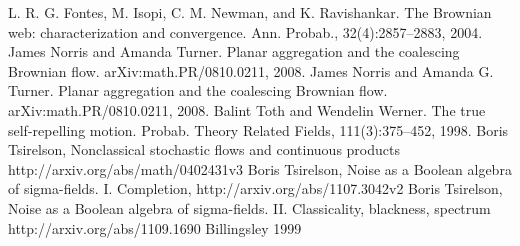 \begin{thebibliography}{99}
 L. R. G. Fontes, M. Isopi, C. M. Newman, and
  K. Ravishankar. The Brownian web: characterization and
  convergence. Ann. Probab., 32(4):2857--2883, 2004.
 James Norris and Amanda
  Turner. Planar aggregation and the coalescing Brownian flow.
  arXiv:math.PR/0810.0211, 2008.
 James Norris and Amanda
  G. Turner. Planar aggregation and the coalescing Brownian
  flow. arXiv:math.PR/0810.0211, 2008.
 Balint Toth and Wendelin Werner. The true
  self-repelling motion. Probab. Theory Related Fields,
  111(3):375--452, 1998.
 Boris Tsirelson,
  Nonclassical stochastic flows and continuous products
  http://arxiv.org/abs/math/0402431v3
 Boris Tsirelson, Noise as a Boolean
  algebra of sigma-fields. I. Completion, http://arxiv.org/abs/1107.3042v2
 Boris Tsirelson,
  Noise as a Boolean algebra of sigma-fields. II. Classicality,
  blackness, spectrum
  http://arxiv.org/abs/1109.1690
 Billingsley 1999
\end{thebibliography}
